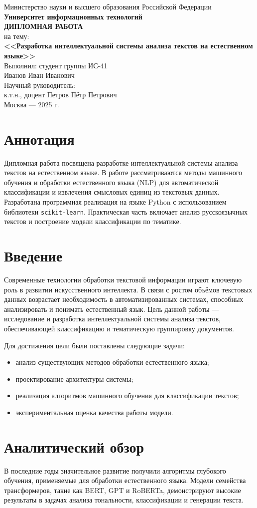 \documentclass[14pt,a4paper]{extarticle}
\newcommand{\TitlePage}{
    \begin{titlepage}
        \centering
        \large
        Министерство науки и высшего образования Российской Федерации\\
        \vspace{0.3cm}
        \textbf{Университет информационных технологий}\\[6cm]

        \textbf{\Large ДИПЛОМНАЯ РАБОТА}\\[0.5cm]
        на тему:\\[0.3cm]
        \textbf{<<Разработка интеллектуальной системы анализа текстов на естественном языке>>}\\[5cm]

        Выполнил: студент группы ИС-41\\
        Иванов Иван Иванович\\[0.5cm]

        Научный руководитель:\\
        к.т.н., доцент Петров Пётр Петрович\\[3cm]

        Москва — 2025 г.
    \end{titlepage}
}
\begin{document}
\TitlePage

\tableofcontents
\newpage

\section*{Аннотация}
Дипломная работа посвящена разработке интеллектуальной системы анализа текстов на естественном языке. 
В работе рассматриваются методы машинного обучения и обработки естественного языка (NLP) для автоматической классификации и извлечения смысловых единиц из текстовых данных. 
Разработана программная реализация на языке Python с использованием библиотеки \texttt{scikit-learn}. 
Практическая часть включает анализ русскоязычных текстов и построение модели классификации по тематике.

\newpage
\section*{Введение}
Современные технологии обработки текстовой информации играют ключевую роль в развитии искусственного интеллекта. 
В связи с ростом объёмов текстовых данных возрастает необходимость в автоматизированных системах, способных анализировать и понимать естественный язык. 
Цель данной работы — исследование и разработка интеллектуальной системы анализа текстов, обеспечивающей классификацию и тематическую группировку документов.

Для достижения цели были поставлены следующие задачи:
\begin{itemize}
    \item анализ существующих методов обработки естественного языка;
    \item проектирование архитектуры системы;
    \item реализация алгоритмов машинного обучения для классификации текстов;
    \item экспериментальная оценка качества работы модели.
\end{itemize}

\newpage
\section{Аналитический обзор}
В последние годы значительное развитие получили алгоритмы глубокого обучения, применяемые для обработки естественного языка. 
Модели семейства трансформеров, такие как BERT, GPT и RoBERTa, демонстрируют высокие результаты в задачах анализа тональности, классификации и генерации текста. 
\end{document}
